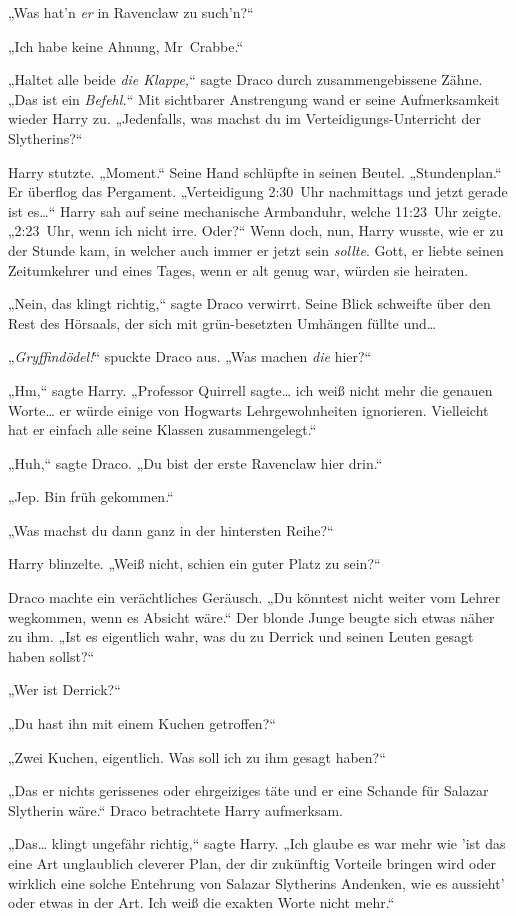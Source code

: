 {„Was hat'n \emph{er} in Ravenclaw zu such'n?“

„Ich habe keine Ahnung, Mr~Crabbe.“

„Haltet alle beide \emph{die Klappe,}“ sagte Draco durch zusammengebissene Zähne. „Das ist ein \emph{Befehl.}“ Mit sichtbarer Anstrengung wand er seine Aufmerksamkeit wieder Harry zu. „Jedenfalls, was machst du im Verteidigungs-Unterricht der Slytherins?“

Harry stutzte. „Moment.“ Seine Hand schlüpfte in seinen Beutel. „Stundenplan.“ Er überflog das Pergament. „Verteidigung 2:30~Uhr nachmittags und jetzt gerade ist es…“ Harry sah auf seine mechanische Armbanduhr, welche 11:23~Uhr zeigte. „2:23~Uhr, wenn ich nicht irre. Oder?“ Wenn doch, nun, Harry wusste, wie er zu der Stunde kam, in welcher auch immer er jetzt sein \emph{sollte}. Gott, er liebte seinen Zeitumkehrer und eines Tages, wenn er alt genug war, würden sie heiraten.

„Nein, das klingt richtig,“ sagte Draco verwirrt. Seine Blick schweifte über den Rest des Hörsaals, der sich mit grün-besetzten Umhängen füllte und…

„\emph{Gryffindödel!}“ spuckte Draco aus. „Was machen \emph{die} hier?“

„Hm,“ sagte Harry. „Professor Quirrell sagte… ich weiß nicht mehr die genauen Worte… er würde einige von Hogwarts Lehrgewohnheiten ignorieren. Vielleicht hat er einfach alle seine Klassen zusammengelegt.“

„Huh,“ sagte Draco. „Du bist der erste Ravenclaw hier drin.“

„Jep. Bin früh gekommen.“

„Was machst du dann ganz in der hintersten Reihe?“

Harry blinzelte. „Weiß nicht, schien ein guter Platz zu sein?“

Draco machte ein verächtliches Geräusch. „Du könntest nicht weiter vom Lehrer wegkommen, wenn es Absicht wäre.“ Der blonde Junge beugte sich etwas näher zu ihm. „Ist es eigentlich wahr, was du zu Derrick und seinen Leuten gesagt haben sollst?“

„Wer ist Derrick?“

„Du hast ihn mit einem Kuchen getroffen?“

„Zwei Kuchen, eigentlich. Was soll ich zu ihm gesagt haben?“

„Das er nichts gerissenes oder ehrgeiziges täte und er eine Schande für Salazar Slytherin wäre.“ Draco betrachtete Harry aufmerksam.

„Das… klingt ungefähr richtig,“ sagte Harry. „Ich glaube es war mehr wie 'ist das eine Art unglaublich cleverer Plan, der dir zukünftig Vorteile bringen wird oder wirklich eine solche Entehrung von Salazar Slytherins Andenken, wie es aussieht' oder etwas in der Art. Ich weiß die exakten Worte nicht mehr.“

}
